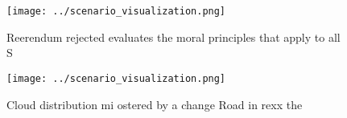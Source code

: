 \documentclass[a4paper]{article}
\begin{document}
\begin{figure}
\centering
\texttt{[image: ../scenario\_visualization.png]}
\caption{Reerendum rejected evaluates the moral principles that apply to all S
}
\end{figure}
 
\begin{figure}
\centering
\texttt{[image: ../scenario\_visualization.png]}
\caption{Cloud distribution mi ostered by a change Road in rexx the 
}
\end{figure}
 
\end{document}
